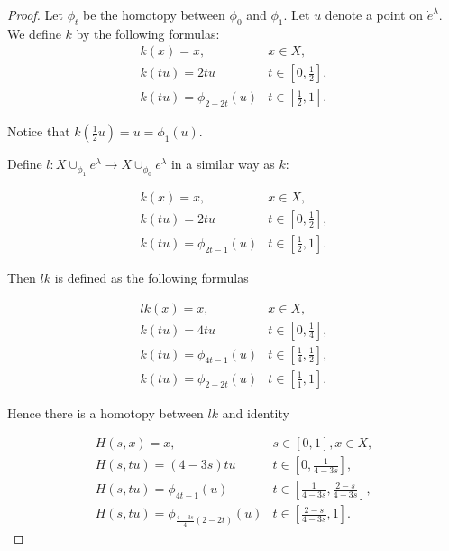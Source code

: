 \documentclass[a4paper,11pt,reqno]{amsart}
\begin{document}
\begin{proof}
  Let $\phi_t$ be the homotopy between $\phi_0$ and $\phi_1$. Let $u$ denote a
  point on $\dot{e}^\lambda$. We define $k$ by the following formulas:
  \begin{equation}
    \begin{array}{lcl}
      k(x) = x, & x \in X, \\
      k(tu) = 2tu & t \in [0,\frac{1}{2}], \\
      k(tu) = \phi_{2-2t}(u) & t \in [\frac{1}{2},1].
    \end{array}
  \end{equation}

  Notice that $k(\frac{1}{2}u) = u = \phi_1(u)$. 

  Define $l : X \cup_{\phi_1} e^\lambda \to X \cup_{\phi_0} e^\lambda$ in a
  similar way as $k$:

  \begin{equation}
    \begin{array}{lcl}
      k(x) = x, & x \in X, \\
      k(tu) = 2tu & t \in [0,\frac{1}{2}], \\
      k(tu) = \phi_{2t-1}(u) & t \in [\frac{1}{2},1].
    \end{array}
  \end{equation}

  Then $lk$ is defined as the following formulas

  \begin{equation}
    \begin{array}{lcl}
      lk(x) = x, & x \in X, \\
      k(tu) = 4tu & t \in [0,\frac{1}{4}], \\
      k(tu) = \phi_{4t-1}(u) & t \in [\frac{1}{4},\frac{1}{2}], \\
      k(tu) = \phi_{2-2t}(u) & t \in [\frac{1}{1},1].
    \end{array}
  \end{equation}

  Hence there is a homotopy between $lk$ and identity

  \begin{equation}
    \begin{array}{lcl}
      H(s, x) = x, & s \in [0,1], x \in X,\\
      H(s, tu) = (4-3s)tu & t \in [0,\frac{1}{4-3s}], \\
      H(s, tu) = \phi_{4t-1}(u) & t \in [\frac{1}{4-3s},\frac{2-s}{4-3s}], \\
      H(s, tu) = \phi_{\frac{4-3s}{4}(2-2t)}(u) & t \in [\frac{2-s}{4-3s},1].
    \end{array}
  \end{equation}


\end{proof}
\end{document}
